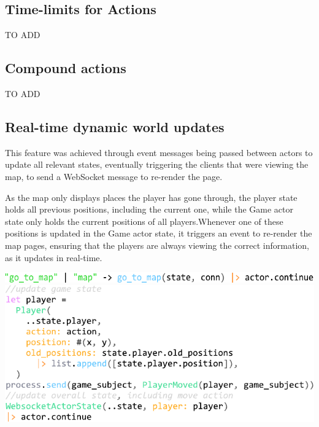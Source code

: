 \documentclass[]{final}
\begin{document}
\subsection{Time-limits for Actions}
TO ADD

\subsection{Compound actions}
TO ADD

\subsection{Real-time dynamic world updates}

This feature was achieved through event messages being passed between actors to
update all relevant states, eventually triggering the clients that were viewing
the map, to send a WebSocket message to re-render the page.

\begin{minipage}[t]{18em}

  As the map only displays places the player has gone through, the player state
  holds all previous positions, including the current one, while the Game actor
  state only holds the current positions of all players.Whenever one of these
  positions is updated in the Game actor state, it triggers an event to re-render
  the map pages, ensuring that the players are always viewing the correct
  information, as it updates in real-time.
\end{minipage}
\hfill
\begin{minipage}[t]{20em}
  \includegraphics[width=\linewidth]{go_to_map.pdf}
  \label{fig: 16}
  \includegraphics[width=\linewidth]{update_state_move.pdf}
  \label{fig: 17}
\end{minipage}
\end{document}

